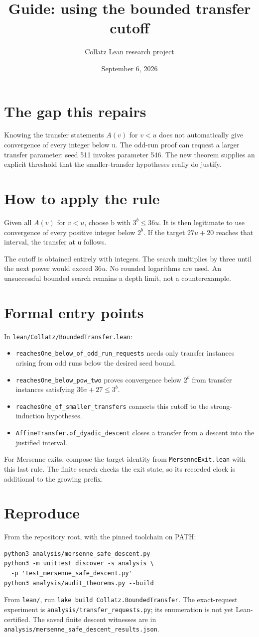 \documentclass[10pt]{article}
\title{Guide: using the bounded transfer cutoff}
\author{Collatz Lean research project}
\date{September 6, 2026}
\begin{document}
\maketitle
\section*{The gap this repairs}
Knowing the transfer statements $A(v)$ for $v<u$ does not automatically give convergence of every integer below u. The odd-run proof can request a larger transfer parameter: seed 511 invokes parameter 546. The new theorem supplies an explicit threshold that the smaller-transfer hypotheses really do justify.
\section*{How to apply the rule}
Given all $A(v)$ for $v<u$, choose b with $3^b\le36u$. It is then legitimate to use convergence of every positive integer below $2^b$. If the target $27u+20$ reaches that interval, the transfer at u follows.

The cutoff is obtained entirely with integers. The search multiplies by three until the next power would exceed $36u$. No rounded logarithms are used. An unsuccessful bounded search remains a depth limit, not a counterexample.
\section*{Formal entry points}
\raggedright
In \texttt{lean/Collatz/BoundedTransfer.lean}:
\begin{itemize}
\item \texttt{reachesOne\_below\_of\_odd\_run\_requests} needs only transfer instances arising from odd runs below the desired seed bound.
\item \texttt{reachesOne\_below\_pow\_two} proves convergence below $2^b$ from transfer instances satisfying $36v+27\le3^b$.
\item \texttt{reachesOne\_of\_smaller\_transfers} connects this cutoff to the strong-induction hypotheses.
\item \texttt{AffineTransfer.of\_dyadic\_descent} closes a transfer from a descent into the justified interval.
\end{itemize}
For Mersenne exits, compose the target identity from \texttt{MersenneExit.lean} with this last rule. The finite search checks the exit state, so its recorded clock is additional to the growing prefix.
\section*{Reproduce}
From the repository root, with the pinned toolchain on PATH:
\begin{verbatim}
python3 analysis/mersenne_safe_descent.py
python3 -m unittest discover -s analysis \
  -p 'test_mersenne_safe_descent.py'
python3 analysis/audit_theorems.py --build
\end{verbatim}
From \texttt{lean/}, run \texttt{lake build Collatz.BoundedTransfer}.
The exact-request experiment is \texttt{analysis/transfer\_requests.py}; its enumeration is not yet Lean-certified. The saved finite descent witnesses are in
\texttt{analysis/mersenne\_safe\_descent\_results.json}.
\end{document}
